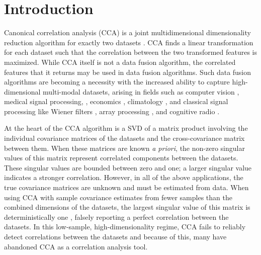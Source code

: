 \section{Introduction}

Canonical correlation analysis (CCA) is a joint multidimensional dimensionality reduction
algorithm for exactly two datasets \cite{hotelling1936relations}. CCA finds a
linear transformation for each dataset such that the correlation between the
two transformed features is maximized. While CCA itself is not a data fusion
algorithm, the correlated features that it returns may be used in data fusion algorithms.
Such data fusion algorithms are becoming a necessity with the increased ability to capture
high-dimensional multi-modal datasets, arising in fields such as computer vision
\cite{hardoon2004canonical, dhillon2011multi, melzer2001nonlinear, zhai2015instance,
  lisanti2014matching,ahsan2014clustering,hardoon2006correlation,chaudhuri2009multi},
medical signal processing, \cite{deleus2011functional, arbabshirani2010comparison,
  khalid2013improving,guccione2013functional, correa2010canonical, lin2013identifying,
  seoane2014canonical, lin2013group, zhang2013l1, nakanishi2014enhancing,
  zhang2014frequency, spuler2013spatial, campi2013non, chen2014removal,
  kuzilek2014comparison}, economics \cite{todros2012measure}, climatology
\cite{wilks2014probabilistic, prera2014using, steward2014assimilating}, and classical
signal processing like Wiener filters \cite{scharf1998wiener}, array processing
\cite{ge2009does}, and cognitive radio \cite{manco2014kernel}.

At the heart of the CCA algorithm is a SVD of a matrix product involving the individual
covariance matrices of the datasets and the cross-covariance matrix between them. When
these matrices are known \textit{a priori}, the non-zero singular values of this matrix
represent correlated components between the datasets. These singular values are bounded
between zero and one; a larger singular value indicates a stronger correlation. However,
in all of the above applications, the true covariance matrices are unknown and must be
estimated from data. When using CCA with sample covariance estimates from fewer samples
than the combined dimensions of the datasets, the largest singular value of this matrix is
deterministically one \cite{pezeshki2004empirical}, falsely reporting a perfect
correlation between the datasets. In this low-sample, high-dimensionality regime, CCA
fails to reliably detect correlations between the datasets and because of this, many have
abandoned CCA as a correlation analysis tool.

